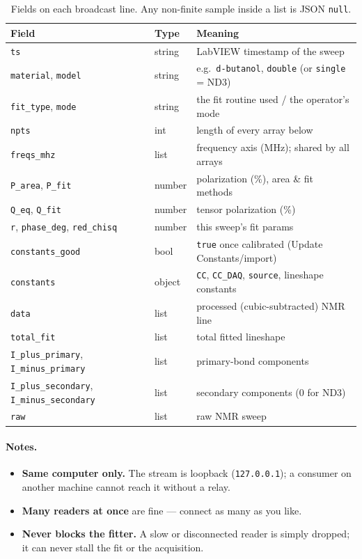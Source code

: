 \documentclass[11pt]{article}
\newcommand{\code}[1]{\lstinline[style=plain]|#1|}
\begin{document}
\begin{table}[h!]
  \centering
  \small
  \begin{tabular}{@{}lll@{}}
    \toprule
    \textbf{Field} & \textbf{Type} & \textbf{Meaning} \\
    \midrule
    \code{ts}                 & string      & LabVIEW timestamp of the sweep \\
    \code{material}, \code{model} & string  & e.g.\ \code{d-butanol}, \code{double} (or \code{single} = ND3) \\
    \code{fit_type}, \code{mode}  & string  & the fit routine used / the operator's mode \\
    \code{npts}               & int         & length of every array below \\
    \code{freqs_mhz}          & list        & frequency axis (MHz); shared by all arrays \\
    \code{P_area}, \code{P_fit}   & number  & polarization (\%), area \& fit methods \\
    \code{Q_eq}, \code{Q_fit}     & number  & tensor polarization (\%) \\
    \code{r}, \code{phase_deg}, \code{red_chisq} & number & this sweep's fit params \\
    \code{constants_good}     & bool        & \code{true} once calibrated (Update Constants/import) \\
    \code{constants}          & object      & \code{CC}, \code{CC_DAQ}, \code{source}, lineshape constants \\
    \code{data}               & list        & processed (cubic-subtracted) NMR line \\
    \code{total_fit}          & list        & total fitted lineshape \\
    \code{I_plus_primary}, \code{I_minus_primary}   & list & primary-bond components \\
    \code{I_plus_secondary}, \code{I_minus_secondary} & list & secondary components (0 for ND3) \\
    \code{raw}                & list        & raw NMR sweep \\
    \bottomrule
  \end{tabular}
  \caption{Fields on each broadcast line. Any non-finite sample inside a list is JSON \code{null}.}
\end{table}

\paragraph{Notes.}
\begin{itemize}[nosep]
  \item \textbf{Same computer only.} The stream is loopback (\code{127.0.0.1}); a consumer on
        another machine cannot reach it without a relay.
  \item \textbf{Many readers at once} are fine --- connect as many as you like.
  \item \textbf{Never blocks the fitter.} A slow or disconnected reader is simply dropped; it
        can never stall the fit or the acquisition.
\end{itemize}
\end{document}

